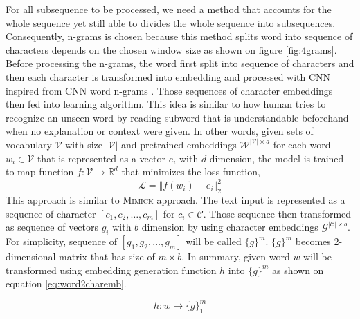         For all subsequence to be processed, we need a method that
        accounts for the whole sequence yet still able to divides the
        whole sequence into subsequences. Consequently, n-grams is
        chosen because this method splits word into sequence of
        characters depends on the chosen window size as shown on
        figure \ref{fig:4grams}. Before processing the n-grams, the
        word first split into sequence of characters and then each
        character is transformed into embedding and processed with CNN
        inspired from CNN word n-grams \citep{convolutional2014kim}.
        Those sequences of character embeddings then fed into learning
        algorithm. This idea is similar to how human tries to
        recognize an unseen word by reading subword that is
        understandable beforehand when no explanation or context were
        given. In other words, given sets of vocabulary $\mathcal{V}$
        with size $\vert\mathcal{V}\vert$ and pretrained embeddings
        $\mathcal{W}^{\vert\mathcal{V}\vert \times d}$ for each word
        $w_{i} \in \mathcal{V}$ that is represented as a vector $e_i$
        with $d$ dimension, the model is trained to map function
        $f:\mathcal{V} \rightarrow \mathbb{R}^d$ that minimizes the
        loss function,
        \begin{equation}
            \label{eq:lossfn}
            \mathcal{L} = \Vert f(w_i) - e_i \Vert^{2}_2
        \end{equation}
        This approach is similar to \textsc{Mimick}
        \cite{mimicking2017Pinter} approach. The text input is
        represented as a sequence of character $[c_1, c_2, \dots,
        c_m]$ for $c_i \in \mathcal{C}$. Those sequence then
        transformed as sequence of vectors $g_i$ with $b$ dimension by
        using character embeddings $\mathcal{G}^{\vert \mathcal{C}
        \vert \times b}$. For simplicity, sequence of $[g_1, g_2,
        \dots, g_m]$ will be called $\{g\}^m$. $\{g\}^m$ becomes
        2-dimensional matrix that has size of $m \times b$. In
        summary, given word $w$ will be transformed using embedding
        generation function $h$ into $\{g\}^m$ as shown on equation
        \ref{eq:word2charemb}.

        \begin{equation}
            \label{eq:word2charemb}
            h: w \rightarrow \{g\}_1^m
        \end{equation}

